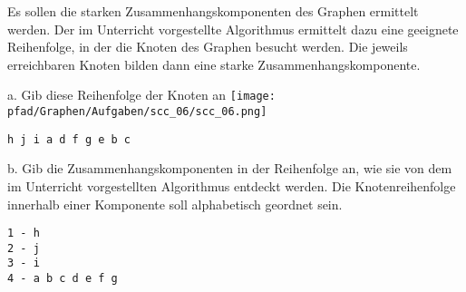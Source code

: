 \question[5]
Es sollen die starken Zusammenhangskomponenten des Graphen ermittelt werden.
Der im Unterricht vorgestellte Algorithmus ermittelt dazu eine
geeignete Reihenfolge, in der die Knoten des Graphen besucht werden. Die
jeweils erreichbaren Knoten bilden dann eine starke Zusammenhangskomponente.

a. Gib diese Reihenfolge der Knoten an
\texttt{[image: \\pfad/Graphen/Aufgaben/scc\_06/scc\_06.png]}
\begin{solutionbox}{2cm}
\begin{lstlisting}
h j i a d f g e b c
\end{lstlisting}
\end{solutionbox}

b. Gib die Zusammenhangskomponenten in der Reihenfolge an, wie sie von
dem im Unterricht vorgestellten Algorithmus entdeckt werden.
Die Knotenreihenfolge innerhalb einer Komponente soll
alphabetisch geordnet sein.
\begin{solutionbox}{4cm}
\begin{lstlisting}
1 - h
2 - j
3 - i
4 - a b c d e f g
\end{lstlisting}
\end{solutionbox}
